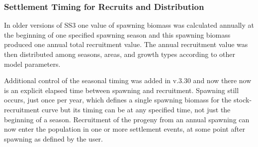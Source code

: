 \subsubsection{Settlement Timing for Recruits and Distribution}
In older versions of SS3 one value of spawning biomass was calculated annually at the beginning of one specified spawning season and this spawning biomass produced one annual total recruitment value. The annual recruitment value was then distributed among seasons, areas, and growth types according to other model parameters.

Additional control of the seasonal timing was added in v.3.30 and now there now is an explicit elapsed time between spawning and recruitment. Spawning still occurs, just once per year, which defines a single spawning biomass for the stock-recruitment curve but its timing can be at any specified time, not just the beginning of a season. Recruitment of the progeny from an annual spawning can now enter the population in one or more settlement events, at some point after spawning as defined by the user.

